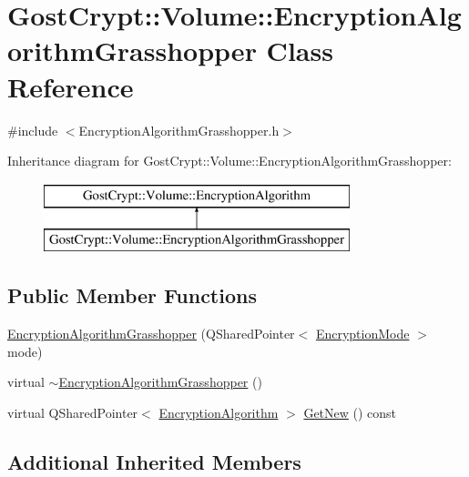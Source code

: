 \hypertarget{class_gost_crypt_1_1_volume_1_1_encryption_algorithm_grasshopper}{}\section{Gost\+Crypt\+:\+:Volume\+:\+:Encryption\+Algorithm\+Grasshopper Class Reference}
\label{class_gost_crypt_1_1_volume_1_1_encryption_algorithm_grasshopper}


{\ttfamily \#include $<$Encryption\+Algorithm\+Grasshopper.\+h$>$}

Inheritance diagram for Gost\+Crypt\+:\+:Volume\+:\+:Encryption\+Algorithm\+Grasshopper\+:\begin{figure}[H]
\begin{center}
\leavevmode
\includegraphics[height=2.000000cm]{class_gost_crypt_1_1_volume_1_1_encryption_algorithm_grasshopper}
\end{center}
\end{figure}
\subsection*{Public Member Functions}
\begin{DoxyCompactItemize}
\item 
\hyperlink{class_gost_crypt_1_1_volume_1_1_encryption_algorithm_grasshopper_a340389e6911e77886f9a3baaae2bb157}{Encryption\+Algorithm\+Grasshopper} (Q\+Shared\+Pointer$<$ \hyperlink{class_gost_crypt_1_1_volume_1_1_encryption_mode}{Encryption\+Mode} $>$ mode)
\item 
virtual \hyperlink{class_gost_crypt_1_1_volume_1_1_encryption_algorithm_grasshopper_a352877bf9c8bb438ffad0ea027546e84}{$\sim$\+Encryption\+Algorithm\+Grasshopper} ()
\item 
virtual Q\+Shared\+Pointer$<$ \hyperlink{class_gost_crypt_1_1_volume_1_1_encryption_algorithm}{Encryption\+Algorithm} $>$ \hyperlink{class_gost_crypt_1_1_volume_1_1_encryption_algorithm_grasshopper_a86dd6ab97c46ad5e2d6291f6df2d2cac}{Get\+New} () const
\end{DoxyCompactItemize}
\subsection*{Additional Inherited Members}


